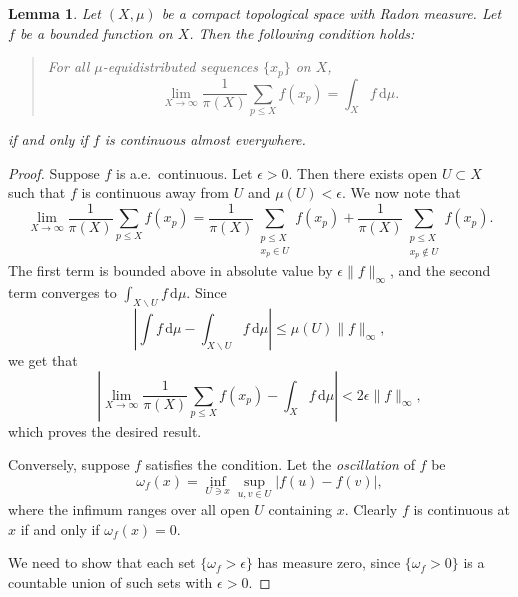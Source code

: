 \documentclass{article}
\newcommand{\dd}{\mathrm{d}}
\newtheorem{lemma}[theorem]{Lemma}
\theoremstyle{definition}
\numberwithin{theorem}{section}
\begin{document}
\begin{lemma}
Let $(X,\mu)$ be a compact topological space with Radon measure. Let $f$ be a 
bounded function on $X$. Then the following condition holds:
\begin{quote}
For all $\mu$-equidistributed sequences $\{x_p\}$ on $X$, 
\[
	\lim_{X\to \infty} \frac{1}{\pi(X)} \sum_{p\leqslant X} f(x_p) = \int_X f\, \dd \mu .
\]
\end{quote}
if and only if $f$ is continuous almost everywhere.
\end{lemma}
\begin{proof}
Suppose $f$ is a.e.~continuous. Let $\epsilon>0$. Then there exists open 
$U\subset X$ such that $f$ is continuous away from $U$ and $\mu(U)<\epsilon$. 
We now note that 
\[
	\lim_{X\to \infty} \frac{1}{\pi(X)} \sum_{p\leqslant X} f(x_p)
		= \frac{1}{\pi(X)} \sum_{\substack{p\leqslant X \\ x_p\in U}} f(x_p) + \frac{1}{\pi(X)} \sum_{\substack{p\leqslant X \\ x_p\notin U}} f(x_p) .
\]
The first term is bounded above in absolute value by $\epsilon  \|f\|_\infty$, 
and the second term converges to $\int_{X\smallsetminus U} f\, \dd\mu$. Since 
\[
	\left|\int f\, \dd\mu - \int_{X\smallsetminus U} f\, \dd\mu\right| \leqslant \mu(U)\|f\|_\infty ,
\]
we get that 
\[
	\left|\lim_{X\to \infty} \frac{1}{\pi(X)} \sum_{p\leqslant X} f(x_p) - \int_X f\, \dd \mu\right| < 2\epsilon \|f\|_\infty ,
\]
which proves the desired result.

Conversely, suppose $f$ satisfies the condition. Let the \emph{oscillation} of 
$f$ be 
\[
	\omega_f(x) = \inf_{U\ni x} \sup_{u,v\in U} |f(u)-f(v)| ,
\] 
where the infimum ranges over all open $U$ containing $x$. Clearly $f$ is 
continuous at $x$ if and only if $\omega_f(x)=0$. 

We need to show that each set $\{\omega_f > \epsilon\}$ has measure zero, since 
$\{\omega_f>0\}$ is a countable union of such sets with $\epsilon>0$. 
\end{proof}





\printbibliography
\end{document}
